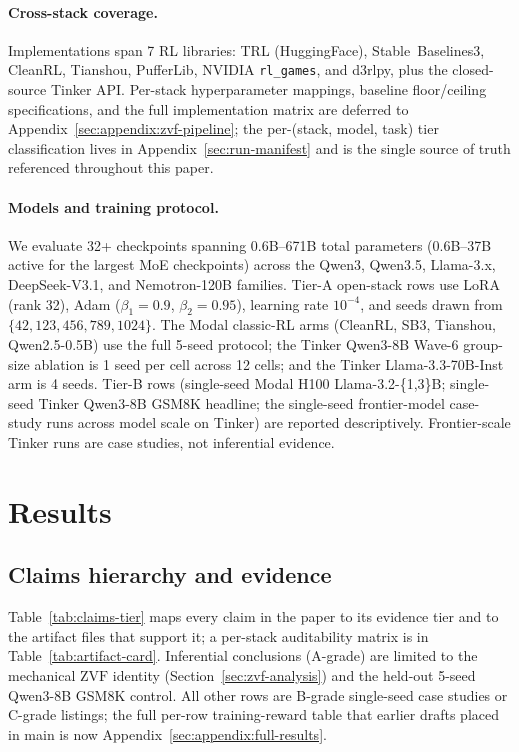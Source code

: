 \documentclass{article}
\begin{document}
\paragraph{Cross-stack coverage.}
Implementations span 7 RL libraries: TRL (HuggingFace),
Stable~Baselines3, CleanRL, Tianshou, PufferLib, NVIDIA \texttt{rl\_games},
and d3rlpy, plus the closed-source Tinker API. Per-stack
hyperparameter mappings, baseline floor/ceiling specifications, and the
full implementation matrix are deferred to
Appendix~\ref{sec:appendix:zvf-pipeline}; the per-(stack, model, task)
tier classification lives in Appendix~\ref{sec:run-manifest} and is the
single source of truth referenced throughout this paper.

\paragraph{Models and training protocol.}
We evaluate 32+ checkpoints spanning 0.6B--671B total parameters
(0.6B--37B active for the largest MoE checkpoints) across the Qwen3,
Qwen3.5, Llama-3.x, DeepSeek-V3.1, and Nemotron-120B families.
Tier-A open-stack rows use LoRA (rank 32), Adam ($\beta_1{=}0.9$,
$\beta_2{=}0.95$), learning rate $10^{-4}$, and seeds drawn from
$\{42,123,456,789,1024\}$. The Modal classic-RL arms (CleanRL, SB3,
Tianshou, Qwen2.5-0.5B) use the full 5-seed protocol; the Tinker Qwen3-8B
Wave-6 group-size ablation is 1 seed per cell across 12 cells; and the
Tinker Llama-3.3-70B-Inst arm is 4 seeds. Tier-B rows (single-seed Modal
H100 Llama-3.2-\{1,3\}B; single-seed Tinker Qwen3-8B GSM8K headline; the
single-seed frontier-model case-study runs across model scale on Tinker)
are reported descriptively. Frontier-scale Tinker runs are case studies,
not inferential evidence.

\section{Results}
\label{sec:results}


\subsection{Claims hierarchy and evidence}
\label{sec:main_results}

Table~\ref{tab:claims-tier} maps every claim in the paper to its evidence
tier and to the artifact files that support it; a per-stack auditability
matrix is in Table~\ref{tab:artifact-card}. Inferential conclusions
(A-grade) are limited to the mechanical $\mathrm{ZVF}$ identity
(Section~\ref{sec:zvf-analysis}) and the held-out 5-seed Qwen3-8B GSM8K
control. All other rows are B-grade single-seed case studies or C-grade
listings; the full per-row training-reward table that earlier drafts
placed in main is now Appendix~\ref{sec:appendix:full-results}.
\end{document}

